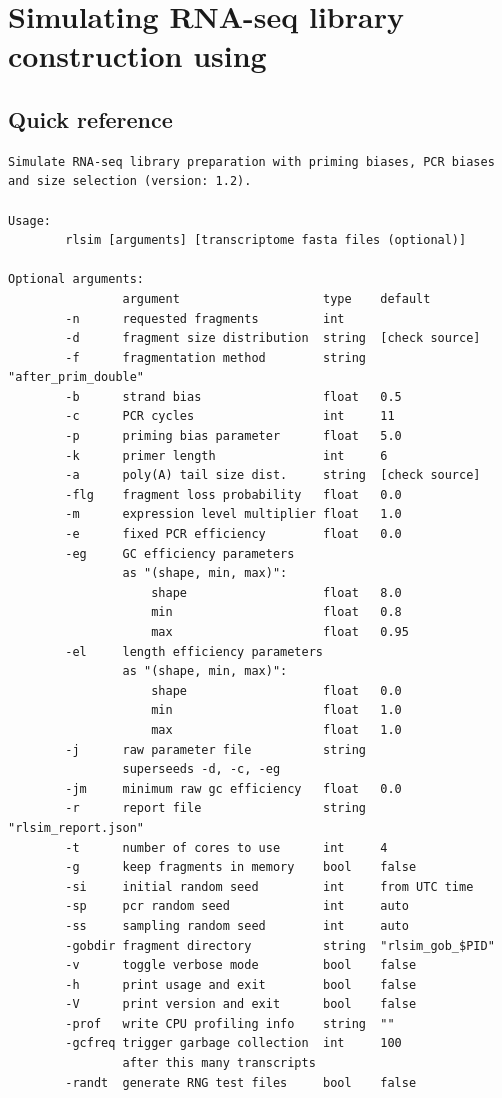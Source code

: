 \section{Simulating RNA-seq library construction using \rlsim}

\subsection{Quick reference}
\label{ss:qrlsim}

\begin{verbatim}
Simulate RNA-seq library preparation with priming biases, PCR biases and size selection (version: 1.2).

Usage:
        rlsim [arguments] [transcriptome fasta files (optional)]

Optional arguments:
                argument                    type    default  
        -n      requested fragments         int     
        -d      fragment size distribution  string  [check source]
        -f      fragmentation method        string  "after_prim_double"
        -b      strand bias                 float   0.5
        -c      PCR cycles                  int     11
        -p      priming bias parameter      float   5.0
        -k      primer length               int     6
        -a      poly(A) tail size dist.     string  [check source]
        -flg    fragment loss probability   float   0.0
        -m      expression level multiplier float   1.0
        -e      fixed PCR efficiency        float   0.0
        -eg     GC efficiency parameters 
                as "(shape, min, max)":
                    shape                   float   8.0
                    min                     float   0.8
                    max                     float   0.95
        -el     length efficiency parameters 
                as "(shape, min, max)":
                    shape                   float   0.0
                    min                     float   1.0
                    max                     float   1.0
        -j      raw parameter file          string  
                superseeds -d, -c, -eg
        -jm     minimum raw gc efficiency   float   0.0
        -r      report file                 string  "rlsim_report.json"
        -t      number of cores to use      int     4
        -g      keep fragments in memory    bool    false
        -si     initial random seed         int     from UTC time
        -sp     pcr random seed             int     auto
        -ss     sampling random seed        int     auto
        -gobdir fragment directory          string  "rlsim_gob_$PID"
        -v      toggle verbose mode         bool    false
        -h      print usage and exit        bool    false
        -V      print version and exit      bool    false
        -prof   write CPU profiling info    string  ""
        -gcfreq trigger garbage collection  int     100
                after this many transcripts
        -randt  generate RNG test files     bool    false


\end{verbatim}
